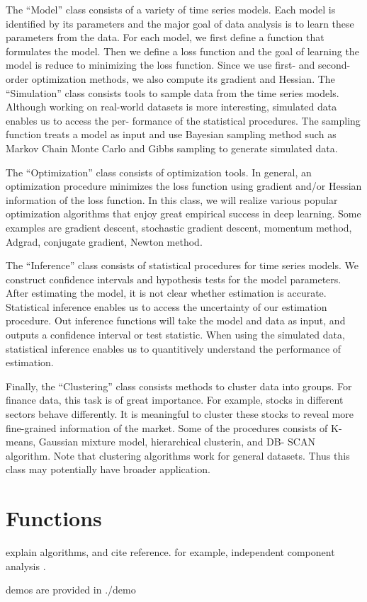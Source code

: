 \documentclass[12pt,a4paper]{article}
\begin{document}
The “Model” class consists of a variety of time series models. Each model is identified by its parameters and the major goal of data analysis is to learn these parameters from the data. For each model, we first define a function that formulates the model. Then we define a loss function and the goal of learning the model is reduce to minimizing the loss function. Since we use first- and second-order optimization methods, we also compute its gradient and Hessian.
The “Simulation” class consists tools to sample data from the time series models. Although working on real-world datasets is more interesting, simulated data enables us to access the per- formance of the statistical procedures. The sampling function treats a model as input and use Bayesian sampling method such as Markov Chain Monte Carlo and Gibbs sampling to generate simulated data.

The “Optimization” class consists of optimization tools. In general, an optimization procedure minimizes the loss function using gradient and/or Hessian information of the loss function. In this class, we will realize various popular optimization algorithms that enjoy great empirical success in deep learning. Some examples are gradient descent, stochastic gradient descent, momentum method, Adgrad, conjugate gradient, Newton method.

The “Inference” class consists of statistical procedures for time series models. We construct confidence intervals and hypothesis tests for the model parameters. After estimating the model, it is not clear whether estimation is accurate. Statistical inference enables us to access the uncertainty of our estimation procedure. Out inference functions will take the model and data as input, and outputs a confidence interval or test statistic. When using the simulated data, statistical inference enables us to quantitively understand the performance of estimation.

Finally, the “Clustering” class consists methods to cluster data into groups. For finance data, this task is of great importance. For example, stocks in different sectors behave differently. It is meaningful to cluster these stocks to reveal more fine-grained information of the market. Some of the procedures consists of K-means, Gaussian mixture model, hierarchical clusterin, and DB- SCAN algorithm. Note that clustering algorithms work for general datasets. Thus this class may potentially have broader application.

\section{Functions}
explain algorithms, and cite reference. for example, independent component analysis \cite{hyvarinen2000independent}.

demos are provided in ./demo


\end{document}
